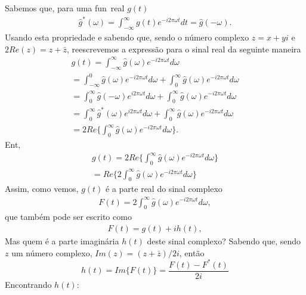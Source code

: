 Sabemos que, para uma fun\cao\ real $g(t)$
\begin{eqnarray}
\hat{g}^{*}(\omega) = \int_{-\infty}^{\infty}g(t)e^{-i2\pi \omega t}dt = \hat{g}(-\omega).
\end{eqnarray}
Usando esta propriedade e sabendo que, sendo o n\'umero complexo
$z=x+yi$ e $2Re(z)=z+\bar{z}$,
reescrevemos a express\~ao para o sinal real da seguinte maneira
\begin{multline}
g(t) = \int_{-\infty}^{\infty}\hat{g}(\omega)e^{-i2\pi \omega t}d\omega \\
= \int_{-\infty}^{0}\hat{g}(\omega)e^{-i2\pi \omega t}d\omega +
\int_{0}^{\infty}\hat{g}(\omega)e^{-i2\pi \omega t}d\omega \\
= \int_{0}^{\infty}\hat{g}(-\omega)e^{i2\pi \omega t}d\omega +
\int_{0}^{\infty}
\hat{g}(\omega)e^{-i2\pi \omega t}d\omega \\
= \int_{0}^{\infty}\hat{g}^{*}(\omega)e^{i2\pi \omega t}d\omega +
\int_{0}^{\infty}\hat{g}(\omega)e^{-i2\pi \omega t}d\omega \\
= 2Re\{ \int_{0}^{\infty}\hat{g}(\omega)e^{-i2\pi \omega t}d\omega \} .
\end{multline}
Ent\ao,
\begin{equation}
\begin{split}
g(t) = 2Re\{ \int_{0}^{\infty}\hat{g}(\omega)e^{-i2\pi \omega t}d\omega \} \\
= Re\{2 \int_{0}^{\infty}\hat{g}(\omega)e^{-i2\pi \omega t}d\omega \}
\end{split}
\end{equation}
Assim, como vemos, $g(t)$ \'e a parte real do sinal complexo
\begin{eqnarray}
F(t) = 2\int_{0}^{\infty}\hat{g}(\omega)e^{-i2\pi \omega t}d\omega,
\end{eqnarray}
que tamb\'em pode ser escrito como
\begin{eqnarray}
F(t) = g(t) + ih(t),
\label{sinan}
\end{eqnarray}
Mas quem \'e a parte imagin\'aria $h(t)$ deste sinal complexo?
Sabendo que, sendo $z$ um n\'umero complexo, $Im(z)=(z+\bar{z})/2i$, ent\~ao %
\begin{equation}
h(t)=Im\{F(t)\} = \frac{F(t) - F^*(t)}{2i}
\end{equation}
Encontrando $h(t)$:
